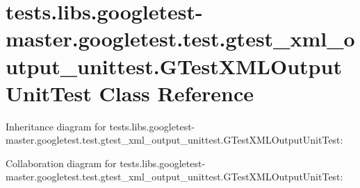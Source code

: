 \hypertarget{classtests_1_1libs_1_1googletest-master_1_1googletest_1_1test_1_1gtest__xml__output__unittest_1_1GTestXMLOutputUnitTest}{}\section{tests.\+libs.\+googletest-\/master.googletest.\+test.\+gtest\+\_\+xml\+\_\+output\+\_\+unittest.\+G\+Test\+X\+M\+L\+Output\+Unit\+Test Class Reference}
\label{classtests_1_1libs_1_1googletest-master_1_1googletest_1_1test_1_1gtest__xml__output__unittest_1_1GTestXMLOutputUnitTest}


Inheritance diagram for tests.\+libs.\+googletest-\/master.googletest.\+test.\+gtest\+\_\+xml\+\_\+output\+\_\+unittest.\+G\+Test\+X\+M\+L\+Output\+Unit\+Test\+:


Collaboration diagram for tests.\+libs.\+googletest-\/master.googletest.\+test.\+gtest\+\_\+xml\+\_\+output\+\_\+unittest.\+G\+Test\+X\+M\+L\+Output\+Unit\+Test\+:
